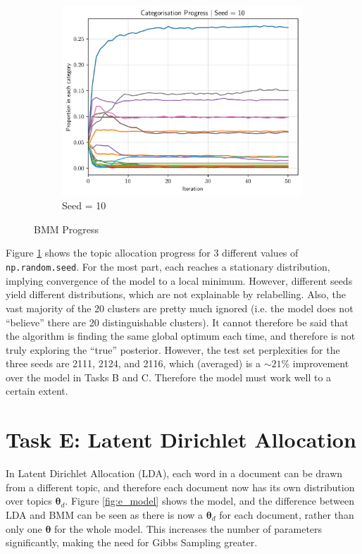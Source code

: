 \documentclass[11pt]{amsart}
\begin{document}
\begin{figure}[h]
\begin{subfigure}[b]{0.32\textwidth}
        \centering
        \includegraphics[width=0.99\textwidth]{../plots/d_progress_seed_10.png}
        \caption{Seed = 10}
    \end{subfigure}
    \caption{BMM Progress}\label{fig:taskd_all}
\end{figure}

Figure \ref{fig:taskd_all} shows the topic allocation progress for 3 different values of \verb|np.random.seed|.  For the most part, each reaches a stationary distribution, implying convergence of the model to a local minimum. However, different seeds yield different distributions, which are not explainable by relabelling. Also, the vast majority of the 20 clusters are pretty much ignored (i.e. the model does not ``believe'' there are 20 distinguishable clusters). It cannot therefore be said that the algorithm is finding the same global optimum each time, and therefore is not truly exploring the ``true'' posterior. However, the test set perplexities for the three seeds are 2111, 2124, and 2116, which (averaged) is a $\sim21$\% improvement over the model in Tasks B and C. Therefore the model must work well to a certain extent.




\section{Task E: Latent Dirichlet Allocation} \label{sec:e}
In Latent Dirichlet Allocation (LDA), each word in a document can be drawn from a different topic, and therefore each document now has its own distribution over topics $\bm{\theta}_d$. Figure \ref{fig:e_model} shows the model, and the difference between LDA and BMM can be seen as there is now a $\bm{\theta}_d$ for each document, rather than only one $\bm{\theta}$ for the whole model. This increases the number of parameters significantly, making the need for Gibbs Sampling greater.
\end{document}
